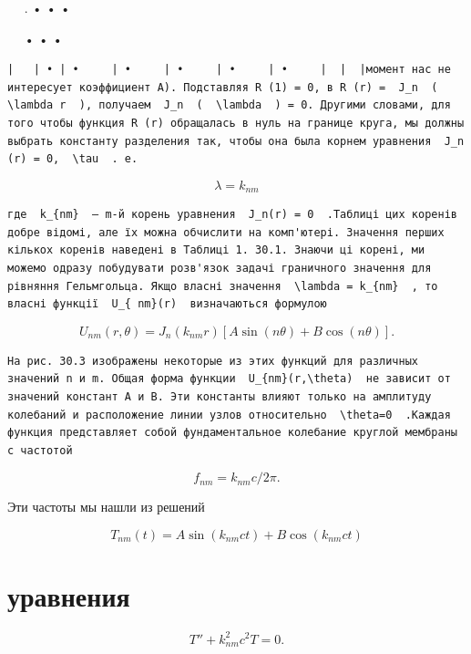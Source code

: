 \documentclass[
  ukrainian,
]{article}
\begin{document}
~~\textbar{} . \textbar{} • \textbar{} \textbar{} • \textbar{}
\textbar{} • \textbar{} \textbar{} \textbar{}

~~\textbar{} \textbar{} \textbar{} • \textbar{} \textbar{} • \textbar{}
• \textbar{} \textbar{} \textbar{}

\begin{verbatim}
|   | • | •     | •     | •     | •     | •     |  |  |момент нас не интересует коэффициент A). Подставляя R (1) = 0, в R (r) =  J_n  (  \lambda r  ), получаем  J_n  (  \lambda  ) = 0. Другими словами, для того чтобы функция R (r) обращалась в нуль на границе круга, мы должны выбрать константу разделения так, чтобы она была корнем уравнения  J_n  (r) = 0,  \tau  . e.
\end{verbatim}

\[
\lambda = k_{nm}
\]

\begin{verbatim}
где  k_{nm}  — m-й корень уравнения  J_n(r) = 0  .Таблиці цих коренів добре відомі, але їх можна обчислити на комп'ютері. Значення перших кількох коренів наведені в Таблиці 1. 30.1. Знаючи ці корені, ми можемо одразу побудувати розв'язок задачі граничного значення для рівняння Гельмгольца. Якщо власні значення  \lambda = k_{nm}  , то власні функції  U_{ nm}(r)  визначаються формулою
\end{verbatim}

\[
U_{nm}(r, \theta) = J_n(k_{nm}r) [A \sin(n\theta) + B \cos(n\theta)].
\]

\begin{verbatim}
На рис. 30.3 изображены некоторые из этих функций для различных значений n и m. Общая форма функции  U_{nm}(r,\theta)  не зависит от значений констант A и B. Эти константы влияют только на амплитуду колебаний и расположение линии узлов относительно  \theta=0  .Каждая функция представляет собой фундаментальное колебание круглой мембраны с частотой
\end{verbatim}

\[
f_{nm} = k_{nm}c/2\pi.
\]

Эти частоты мы нашли из решений

\[
T_{nm}(t) = A \sin(k_{nm}ct) + B \cos(k_{nm}ct)
\]

\section{уравнения}\label{ux443ux440ux430ux432ux43dux435ux43dux438ux44f}

\[
T'' + k_{nm}^2 c^2 T = 0.
\]
\end{document}
